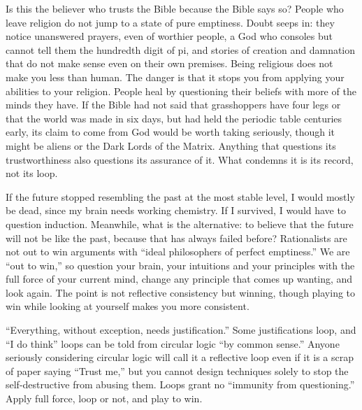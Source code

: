 Is this the believer who trusts the Bible because the Bible says so? People who leave religion do not jump to a state of pure emptiness. Doubt seeps in: they notice unanswered prayers, even of worthier people, a God who consoles but cannot tell them the hundredth digit of pi, and stories of creation and damnation that do not make sense even on their own premises. Being religious does not make you less than human. The danger is that it stops you from applying your abilities to your religion. People heal by questioning their beliefs with more of the minds they have.  If the Bible had not said that grasshoppers have four legs or that the world was made in six days, but had held the periodic table centuries early, its claim to come from God would be worth taking seriously, though it might be aliens or the Dark Lords of the Matrix. Anything that questions its trustworthiness also questions its assurance of it. What condemns it is its record, not its loop.

If the future stopped resembling the past at the most stable level, I would mostly be dead, since my brain needs working chemistry. If I survived, I would have to question induction. Meanwhile, what is the alternative: to believe that the future will not be like the past, because that has always failed before? Rationalists are not out to win arguments with ``ideal philosophers of perfect emptiness.'' We are ``out to win,'' so question your brain, your intuitions and your principles with the full force of your current mind, change any principle that comes up wanting, and look again. The point is not reflective consistency but winning, though playing to win while looking at yourself makes you more consistent. 

``Everything, without exception, needs justification.'' Some justifications loop, and ``I do think'' loops can be told from circular logic ``by common sense.''  Anyone seriously considering circular logic will call it a reflective loop even if it is a scrap of paper saying ``Trust me,'' but you cannot design techniques solely to stop the self-destructive from abusing them. Loops grant no ``immunity from questioning.'' Apply full force, loop or not, and play to win. 
